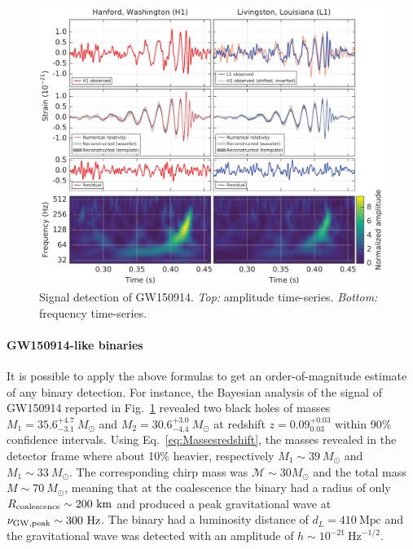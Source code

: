 \documentclass[a4paper,titlepage]{book}     	%
\newcommand{\sun}{\ensuremath{_\odot}}
\newcommand{\msun}{\ensuremath{M\sun}}
\begin{document}
\begin{figure}[h]
	\includegraphics[width=\textwidth]{./images/GW150914.png}
	\caption{Signal detection of GW150914. \textit{Top:} amplitude time-series. \textit{Bottom:} frequency time-series. \cite{Abbott2016firstGW}}\label{fig:GW150914}
\end{figure}

\paragraph{GW150914-like binaries} It is possible to apply the above formulas to get an order-of-magnitude estimate of any binary detection. For instance, the Bayesian analysis of the signal of GW150914 reported in Fig.\ \ref{fig:GW150914} revealed two black holes of masses $M_1=35.6^{+4.7}_{-3.1} ~ \msun$ and $M_2=30.6^{+3.0}_{-4.4} ~ \msun$ at redshift $z=0.09^{+0.03}_{0.03}$ within 90\% confidence intervals. \cite{GWTC-1} Using Eq.\ \ref{eq:Massesredshift}, the masses revealed in the detector frame where about 10\% heavier, respectively $M_1 \sim 39 ~ \msun$ and $M_1 \sim 33 ~ \msun$. The corresponding chirp mass was $\mathcal{M} \sim 30 \msun$ and the total mass $M \sim 70 ~ \msun$, meaning that at the coalescence the binary had a radius of only $R_{\rm coalescence} \sim 200~\text{km}$ and produced a peak gravitational wave at $\nu_{\rm GW, peak} \sim 300 ~\text{Hz}$. The binary had a luminosity distance of $d_L=410~\text{Mpc}$ and the gravitational wave was detected with an amplitude of $h \sim 10^{-21}~ \text{Hz}^{-1/2}$.
\end{document}
